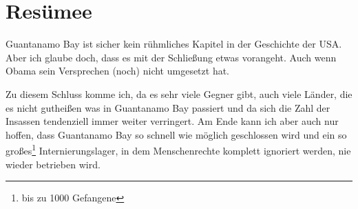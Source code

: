 \section{Resümee}
Guantanamo Bay ist sicher kein rühmliches Kapitel in der Geschichte der USA.
Aber ich glaube doch, dass es mit der Schließung etwas vorangeht.
Auch wenn Obama sein Versprechen (noch) nicht umgesetzt hat.

Zu diesem Schluss komme ich, da es sehr viele Gegner gibt, auch viele Länder, die es nicht gutheißen
was in Guantanamo Bay passiert und da sich die Zahl der Insassen tendenziell immer weiter
verringert.
Am Ende kann ich aber auch nur hoffen, dass Guantanamo Bay so schnell wie möglich geschlossen wird
und ein so großes\footnote{bis zu 1000 Gefangene} Internierungslager, in dem Menschenrechte komplett
ignoriert werden, nie wieder betrieben wird.
